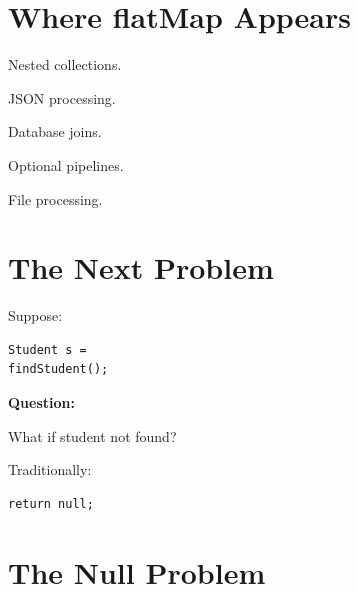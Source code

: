\documentclass[11pt,a4paper]{book}
\begin{document}

\section{Where flatMap Appears}


Nested collections.


JSON processing.


Database joins.


Optional pipelines.


File processing.


\section{The Next Problem}

Suppose:

\begin{verbatim} 
Student s =
findStudent();
\end{verbatim}


\textbf{Question:}


What if student not found?


Traditionally:

\begin{verbatim} 
return null;
\end{verbatim}


\section{The Null Problem}
\end{document}

